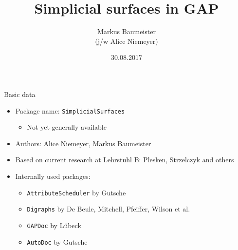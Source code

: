 \documentclass[11pt]{beamer}
\author[M. Baumeister]{Markus Baumeister\\ \vspace{1mm} \small{(j/w Alice Niemeyer)}}
\title{Simplicial surfaces in GAP}
\institute[RWTH Aachen]{Lehrstuhl B für Mathematik\\RWTH Aachen University}
\date{30.08.2017}
\begin{document}
\begin{frame}
\titlepage
\end{frame}

\begin{frame}{Basic data}
    \begin{itemize}
        \item Package name: \texttt{SimplicialSurfaces}
            \begin{itemize}
                \pause
                \item Not yet generally available
            \end{itemize}
        \pause
        \item Authors: Alice Niemeyer, Markus Baumeister
        \pause
        \item Based on current research at Lehrstuhl B: Plesken, Strzelczyk and others
        \pause
        \item Internally used packages:
            \begin{itemize}
                \pause
                \item \texttt{AttributeScheduler} by Gutsche
                \pause
                \item \texttt{Digraphs} by De Beule, Mitchell, Pfeiffer, Wilson et al.
                \pause
                \item \texttt{GAPDoc} by Lübeck
                \pause
                \item \texttt{AutoDoc} by Gutsche
            \end{itemize}
    \end{itemize}
\end{frame}
\end{document}
